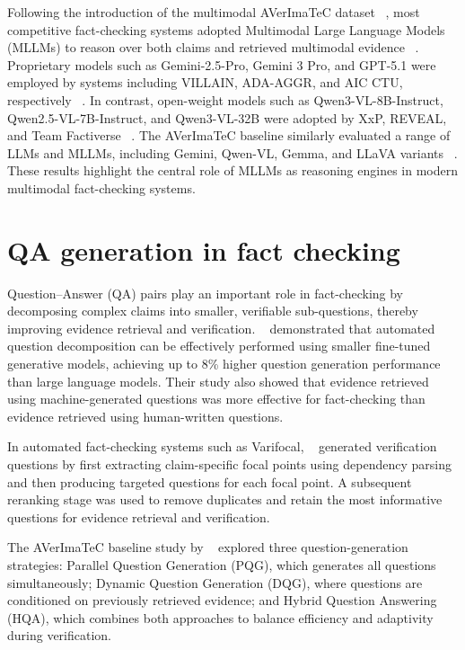 Following the introduction of the multimodal AVerImaTeC dataset ~\cite{Cao2025May}, most competitive fact-checking systems adopted Multimodal Large Language Models (MLLMs) to reason over both claims and retrieved multimodal evidence ~\cite{Cao2026Mar}. Proprietary models such as Gemini-2.5-Pro, Gemini 3 Pro, and GPT-5.1 were employed by systems including VILLAIN, ADA-AGGR, and AIC CTU, respectively ~\cite{Jung2026Mar,Upravitelev2026Mar,Ullrich2026Mar}. In contrast, open-weight models such as Qwen3-VL-8B-Instruct, Qwen2.5-VL-7B-Instruct, and Qwen3-VL-32B were adopted by XxP, REVEAL, and Team Factiverse ~\cite{Tsoneva2026Mar,Tariq2026Mar}. The AVerImaTeC baseline similarly evaluated a range of LLMs and MLLMs, including Gemini, Qwen-VL, Gemma, and LLaVA variants ~\cite{Cao2025May}. These results highlight the central role of MLLMs as reasoning engines in modern multimodal fact-checking systems.

\section{QA generation in fact checking}

Question–Answer (QA) pairs play an important role in fact-checking by decomposing complex claims into smaller, verifiable sub-questions, thereby improving evidence retrieval and verification. ~\citet{Setty2024Jul} demonstrated that automated question decomposition can be effectively performed using smaller fine-tuned generative models, achieving up to 8\% higher question generation performance than large language models. Their study also showed that evidence retrieved using machine-generated questions was more effective for fact-checking than evidence retrieved using human-written questions.

In automated fact-checking systems such as Varifocal, ~\citet{Ousidhoum2022Dec} generated verification questions by first extracting claim-specific focal points using dependency parsing and then producing targeted questions for each focal point. A subsequent reranking stage was used to remove duplicates and retain the most informative questions for evidence retrieval and verification.

The AVerImaTeC baseline study by ~\citet{Cao2025May} explored three question-generation strategies: Parallel Question Generation (PQG), which generates all questions simultaneously; Dynamic Question Generation (DQG), where questions are conditioned on previously retrieved evidence; and Hybrid Question Answering (HQA), which combines both approaches to balance efficiency and adaptivity during verification.


